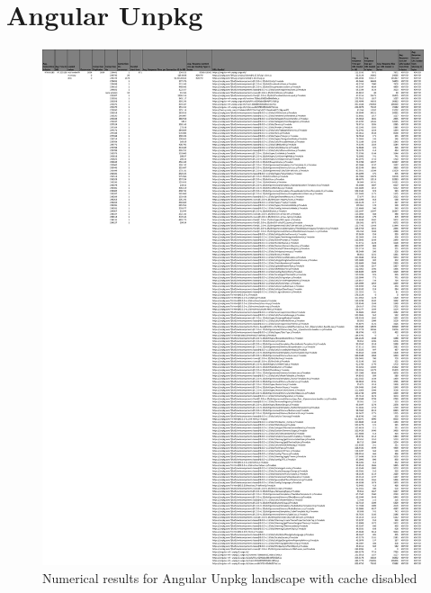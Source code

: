 \section{Angular Unpkg}

\begin{figure}[!h]
	\centering
	\begin{adjustbox}{width=\textwidth,totalheight=0.8\textheight}
		\includegraphics[angle=90]{Figures/angular_unpkg_allhar.pdf}
	\end{adjustbox}
	\caption{Numerical results for Angular Unpkg landscape with cache disabled}
	\label{fig:appendix_1_6}
\end{figure}
\newpage
